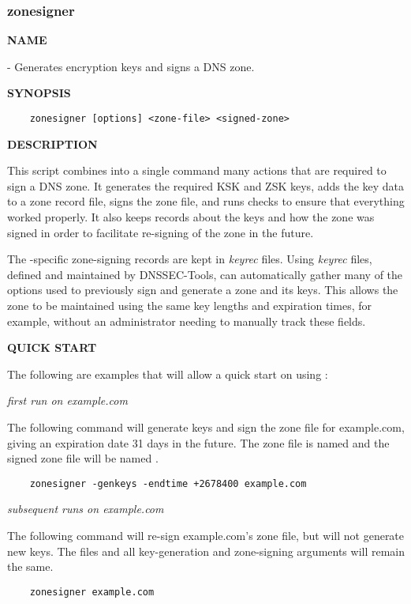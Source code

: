 \clearpage

\subsubsection{\bf zonesigner}

{\bf NAME}

 - Generates encryption keys and signs a DNS zone.

{\bf SYNOPSIS}

\begin{verbatim}
    zonesigner [options] <zone-file> <signed-zone>
\end{verbatim}

{\bf DESCRIPTION}

This script combines into a single command many actions that are required to
sign a DNS zone.  It generates the required KSK and ZSK keys, adds the key
data to a zone record file, signs the zone file, and runs checks to ensure
that everything worked properly.  It also keeps records about the keys and
how the zone was signed in order to facilitate re-signing of the zone in the
future.

The -specific zone-signing records are kept in {\it keyrec}
files.  Using {\it keyrec} files, defined and maintained by DNSSEC-Tools,
 can automatically gather many of the options used to previously
sign and generate a zone and its keys.  This allows the zone to be maintained
using the same key lengths and expiration times, for example, without an
administrator needing to manually track these fields.

{\bf QUICK START}

The following are examples that will allow a quick start on using
:

\begin{description}

\item {\it first run on example.com}\verb" "

The following command will generate keys and sign the zone file for
example.com, giving an expiration date 31 days in the future.  The zone
file is named  and the signed zone file will be named
.

\begin{verbatim}
    zonesigner -genkeys -endtime +2678400 example.com
\end{verbatim}

\item {\it subsequent runs on example.com}\verb" "

The following command will re-sign example.com's zone file, but will not
generate new keys.  The files and all key-generation and zone-signing
arguments will remain the same.

\begin{verbatim}
    zonesigner example.com
\end{verbatim}

\end{description}

